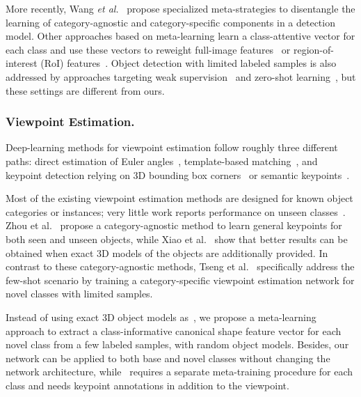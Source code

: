 \documentclass[runningheads]{llncs}
\newcommand{\etal}{\textit{et al.}\xspace}
\begin{document}
More recently, Wang \etal~\cite{MetaDet2019} propose specialized meta-strategies to disentangle the learning of category-agnostic and category-specific components in a detection model.
Other approaches based on meta-learning learn a class-attentive vector for each class and use these vectors to reweight full-image features~\cite{YOLO-FS2019} or region-of-interest (RoI) features~\cite{metarcnn2019}.
Object detection with limited labeled samples is also addressed by approaches targeting weak supervision~\cite{Song2014WeaklysupervisedDO,Bilen2015WeaklySD,Diba2016WeaklySC,shen2019discovery} and zero-shot learning~\cite{Bansal2018ZeroShotOD,Rahman2018ZeroShotOD,Zhu2019ZeroShot}, but these settings are different from ours.


\subsubsection{Viewpoint Estimation.}
Deep-learning methods for viewpoint estimation follow roughly three different paths: direct estimation of Euler angles~\cite{ViewpointsKeypoints2015,Su2015RenderFC,Mousavian20163DBB,Kehl2017SSD6DMR,xiang2018posecnn,Xiao2019PoseFromShape}, template-based matching~\cite{Hinterstoier2012ModelBT,Massa2015DeepE2,Sundermeyer2018Implicit3O}, and keypoint detection relying on 3D bounding box corners~\cite{Rad2017BB8AS,Tekin2017RealTimeSS,Grabner20183DPE,Oberweger2018MakingDH,Pitteri2019CorNetG3} or semantic keypoints~\cite{Pavlakos20176DoFOP,starmap2018}.

Most of the existing viewpoint estimation methods are designed for known object categories or instances; very little work reports performance on unseen classes~\cite{Tulsiani2015PoseIF,starmap2018,Pitteri2019CorNetG3,Tseng2019FewShotVE,Xiao2019PoseFromShape}. Zhou et al.~\cite{starmap2018} propose a category-agnostic method to learn general keypoints for both seen and unseen objects, while Xiao et al.~\cite{Xiao2019PoseFromShape} show that better results can be obtained when exact 3D models of the objects are additionally provided.
In contrast to these category-agnostic methods, Tseng et al.~\cite{Tseng2019FewShotVE} specifically address the few-shot scenario by training a category-specific viewpoint estimation network for novel classes with limited samples.

Instead of using exact 3D object models as~\cite{Xiao2019PoseFromShape}, we propose a meta-learning approach to extract a class-informative canonical shape feature vector for each novel class from a few labeled samples, with random object models.
Besides, our network can be applied to both base and novel classes without changing the network architecture, while~\cite{Tseng2019FewShotVE} requires a separate meta-training procedure for each class and needs keypoint annotations in addition to the viewpoint.
\end{document}
